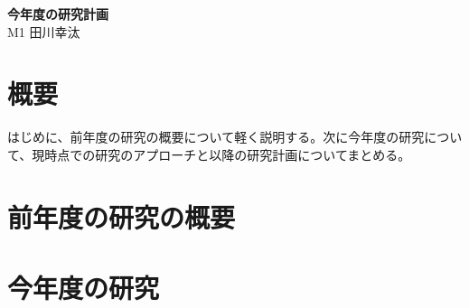 \documentclass[]{jarticle}          %
\begin{document}

\vspace*{2ex}
\begin{center}
 {\Large \bf 今年度の研究計画}\\ %
 \vspace*{5mm}
 {\large M1 田川幸汰}%
\end{center}






\section{概要}
はじめに、前年度の研究の概要について軽く説明する。次に今年度の研究について、現時点での研究のアプローチと以降の研究計画についてまとめる。

\section{前年度の研究の概要}

\section{今年度の研究}
\end{document}
